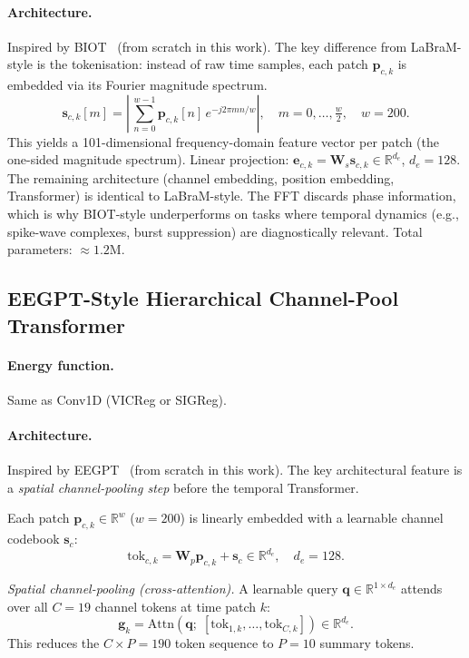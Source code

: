 \documentclass[11pt,a4paper]{article}
\begin{document}
\paragraph{Architecture.}
Inspired by BIOT~\cite{biot} (from scratch in this work).
The key difference from LaBraM-style is the tokenisation: instead of raw time
samples, each patch $\mathbf{p}_{c,k}$ is embedded via its Fourier magnitude spectrum.
\begin{equation}
  \mathbf{s}_{c,k}[m] = \left|\,\sum_{n=0}^{w-1}
    \mathbf{p}_{c,k}[n]\, e^{-j 2\pi m n / w}\right|,
  \quad m = 0,\ldots,\tfrac{w}{2},
  \quad w{=}200.
\end{equation}
This yields a 101-dimensional frequency-domain feature vector per patch
(the one-sided magnitude spectrum).  Linear projection:
$\mathbf{e}_{c,k} = \mathbf{W}_s \mathbf{s}_{c,k} \in \mathbb{R}^{d_e}$, $d_e{=}128$.
The remaining architecture (channel embedding, position embedding, Transformer)
is identical to LaBraM-style.  The FFT discards phase information, which is why
BIOT-style underperforms on tasks where temporal dynamics (e.g., spike-wave
complexes, burst suppression) are diagnostically relevant.
Total parameters: $\approx 1.2$M.

\subsection{EEGPT-Style Hierarchical Channel-Pool Transformer}
\label{sec:math_eegpt}

\paragraph{Energy function.}
Same as Conv1D (VICReg or SIGReg).

\paragraph{Architecture.}
Inspired by EEGPT~\cite{eegpt} (from scratch in this work).
The key architectural feature is a \emph{spatial channel-pooling step} before the
temporal Transformer.

Each patch $\mathbf{p}_{c,k} \in \mathbb{R}^{w}$ ($w{=}200$) is linearly embedded
with a learnable channel codebook $\mathbf{s}_c$:
\begin{equation}
  \mathrm{tok}_{c,k} = \mathbf{W}_p \mathbf{p}_{c,k} + \mathbf{s}_c \in \mathbb{R}^{d_e},
  \quad d_e{=}128.
\end{equation}

\textit{Spatial channel-pooling (cross-attention).}
A learnable query $\mathbf{q} \in \mathbb{R}^{1 \times d_e}$ attends over all
$C{=}19$ channel tokens at time patch $k$:
\begin{equation}
  \mathbf{g}_k = \mathrm{Attn}\!\left(\mathbf{q};\;
    [\mathrm{tok}_{1,k}, \ldots, \mathrm{tok}_{C,k}]\right)
  \in \mathbb{R}^{d_e}.
\end{equation}
This reduces the $C \times P = 190$ token sequence to $P{=}10$ summary tokens.
\end{document}
